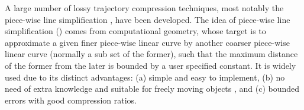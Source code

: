 A large number of lossy trajectory compression techniques, most notably the piece-wise line simplification \cite{Douglas:Peucker, Hershberger:Speeding, Keogh:online,Liu:BQS, Muckell:Compression, Chen:Trajectory, Chen:Fast, Cao:Spatio, Shi:Survey}, have been developed. The idea of piece-wise line simplification (\lsa) comes from computational geometry, whose target is to approximate a given finer piece-wise linear curve by another coarser piece-wise linear curve ({normally} a sub set of the former), such that the maximum distance of the former from the later is bounded by a user specified constant. It is widely used due to its distinct advantages: (a) simple and easy to implement, (b) no need of extra knowledge and suitable for freely  moving  objects \cite{Popa:Spatio}, and (c) bounded errors with good compression ratios.

